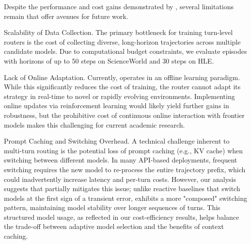 
Despite the performance and cost gains demonstrated by \method, several limitations remain that offer avenues for future work.

Scalability of Data Collection. The primary bottleneck for training turn-level routers is the cost of collecting diverse, long-horizon trajectories across multiple candidate models. Due to computational budget constraints, we evaluate episodes with horizons of up to 50 steps on ScienceWorld and 30 steps on HLE.

Lack of Online Adaptation. Currently, \method operates in an offline learning paradigm. While this significantly reduces the cost of training, the router cannot adapt its strategy in real-time to novel or rapidly evolving environments. Implementing online updates via reinforcement learning would likely yield further gains in robustness, but the prohibitive cost of continuous online interaction with frontier models makes this challenging for current academic research.

Prompt Caching and Switching Overhead. A technical challenge inherent to multi-turn routing is the potential loss of prompt caching (e.g., KV cache) when switching between different models. In many API-based deployments, frequent switching requires the new model to re-process the entire trajectory prefix, which could inadvertently increase latency and per-turn costs. However, our analysis suggests that \method partially mitigates this issue; unlike reactive baselines that switch models at the first sign of a transient error, \method exhibits a more "composed" switching pattern, maintaining model stability over longer sequences of turns. This structured model usage, as reflected in our cost-efficiency results, helps balance the trade-off between adaptive model selection and the benefits of context caching.
